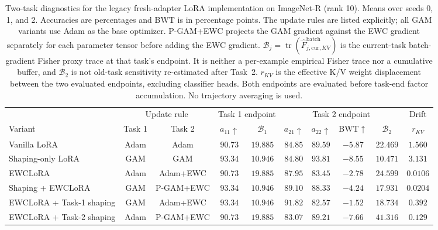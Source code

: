 \begin{table}[t]
\centering
\captionsetup{font=footnotesize,labelfont=bf}
\caption{Two-task diagnostics for the legacy fresh-adapter LoRA implementation
on ImageNet-R (rank 10). Means over seeds 0, 1, and 2.
Accuracies are percentages and BWT is in percentage points.
The update rules are listed explicitly; all GAM variants use Adam as the base
optimizer. P-GAM+EWC projects the GAM gradient against the EWC gradient separately
for each parameter tensor before adding the EWC gradient.
$\mathcal B_j=\operatorname{tr}(\widehat F^{\mathrm{batch}}_{j,\mathrm{cur},KV})$
is the current-task batch-gradient Fisher proxy trace at that task's endpoint.
It is neither a per-example empirical Fisher trace nor a cumulative buffer,
and $\mathcal B_2$ is not old-task sensitivity re-estimated after Task~2.
$r_{KV}$ is the effective K/V weight displacement between the two evaluated
endpoints, excluding classifier heads.
Both endpoints are evaluated before task-end factor accumulation.
No trajectory averaging is used.}
\label{tab:two_task_lora_diagnostics}
\scriptsize
\setlength{\tabcolsep}{2.5pt}
\renewcommand{\arraystretch}{1.08}
\begin{tabular*}{\textwidth}{@{\extracolsep{\fill}}lccccccccc@{}}
\toprule
& \multicolumn{2}{c}{Update rule}
& \multicolumn{2}{c}{Task 1 endpoint}
& \multicolumn{4}{c}{Task 2 endpoint}
& Drift \\
\cmidrule(lr){2-3}\cmidrule(lr){4-5}\cmidrule(lr){6-9}
Variant & Task 1 & Task 2
& $a_{11}\uparrow$ & $\mathcal B_1$
& $a_{21}\uparrow$ & $a_{22}\uparrow$ & BWT$\uparrow$ & $\mathcal B_2$
& $r_{KV}$ \\
\midrule
Vanilla LoRA & Adam & Adam & $90.73$ & $19.885$ & $84.85$ & $89.59$ & $-5.87$ & $22.469$ & $1.560$ \\
Shaping-only LoRA & GAM & GAM & $93.34$ & $10.946$ & $84.80$ & $93.81$ & $-8.55$ & $10.471$ & $3.131$ \\
EWCLoRA & Adam & Adam+EWC & $90.73$ & $19.885$ & $87.95$ & $83.45$ & $-2.78$ & $24.599$ & $0.0106$ \\
Shaping + EWCLoRA & GAM & P-GAM+EWC & $93.34$ & $10.946$ & $89.10$ & $88.33$ & $-4.24$ & $17.931$ & $0.0204$ \\
\midrule
EWCLoRA + Task-1 shaping & GAM & Adam+EWC & $93.34$ & $10.946$ & $91.82$ & $82.57$ & $-1.52$ & $18.734$ & $0.392$ \\
EWCLoRA + Task-2 shaping & Adam & P-GAM+EWC & $90.73$ & $19.885$ & $83.07$ & $89.21$ & $-7.66$ & $41.316$ & $0.129$ \\

\end{tabular*}
\end{table}

